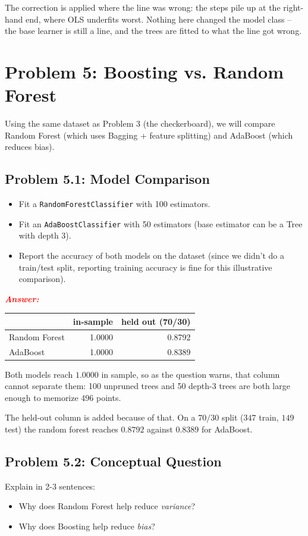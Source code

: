 \documentclass[11pt, letterpaper]{article}
\newcommand{\problem}[1]{\section*{Problem #1}}
\newcommand{\subproblem}[1]{\subsection*{Problem #1}}
\newcommand{\answer}{\textbf{\textit{\textcolor{red}{Answer:}}}}
\begin{document}
The correction is applied where the line was wrong: the steps pile up at the right-hand end, where
OLS underfits worst. Nothing here changed the model class -- the base learner is still a line, and
the trees are fitted to what the line got wrong.


\problem{5: Boosting vs. Random Forest}

Using the same dataset as Problem 3 (the checkerboard), we will compare Random Forest (which uses Bagging + feature splitting) and AdaBoost (which reduces bias).

\subproblem{5.1: Model Comparison}
\begin{itemize}
    \item Fit a \texttt{RandomForestClassifier} with 100 estimators.
    \item Fit an \texttt{AdaBoostClassifier} with 50 estimators (base estimator can be a Tree with depth 3).
    \item Report the accuracy of both models on the dataset (since we didn't do a train/test split, reporting training accuracy is fine for this illustrative comparison).
\end{itemize}

\answer

\begin{center}
\begin{tabular}{lrr}
\toprule
 & in-sample & held out (70/30) \\
\midrule
Random Forest & 1.0000 & 0.8792 \\
AdaBoost & 1.0000 & 0.8389 \\
\bottomrule
\end{tabular}
\end{center}

Both models reach $1.0000$ in sample, so as the question warns, that column cannot separate them:
100 unpruned trees and 50 depth-3 trees are both large enough to memorize 496 points.

The held-out column is added because of that. On a $70/30$ split ($347$ train, $149$ test) the
random forest reaches $0.8792$ against $0.8389$ for AdaBoost.


\subproblem{5.2: Conceptual Question}
Explain in 2-3 sentences:
\begin{itemize}
    \item Why does Random Forest help reduce \textit{variance}?
    \item Why does Boosting help reduce \textit{bias}?
\end{itemize}
\end{document}
